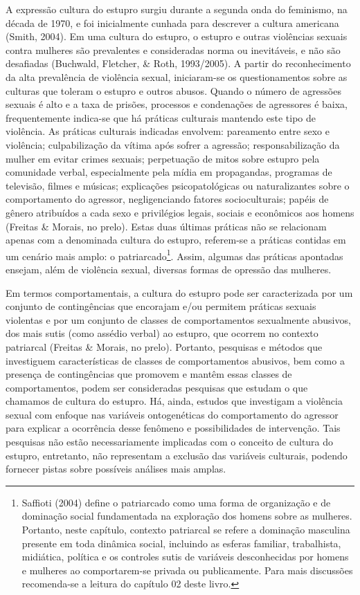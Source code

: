 A expressão cultura do estupro surgiu durante a segunda onda do feminismo, na década de 1970, e foi inicialmente cunhada para descrever a cultura americana (Smith, 2004). Em uma cultura do estupro, o estupro e outras violências sexuais contra mulheres são prevalentes e consideradas norma ou inevitáveis, e não são desafiadas (Buchwald, Fletcher, \& Roth, 1993/2005). A partir do reconhecimento da alta prevalência de violência sexual, iniciaram-se os questionamentos sobre as culturas que toleram o estupro e outros abusos. Quando o número de agressões sexuais é alto e a taxa de prisões, processos e condenações de agressores é baixa, frequentemente indica-se que há práticas culturais mantendo este tipo de violência. As práticas culturais indicadas envolvem: pareamento entre sexo e violência; culpabilização da vítima após sofrer a agressão; responsabilização da mulher em evitar crimes sexuais; perpetuação de mitos sobre estupro pela comunidade verbal, especialmente pela mídia em propagandas, programas de televisão, filmes e músicas; explicações psicopatológicas ou naturalizantes sobre o comportamento do agressor, negligenciando fatores socioculturais; papéis de gênero atribuídos a cada sexo e privilégios legais, sociais e econômicos aos homens (Freitas \& Morais, no prelo). Estas duas últimas práticas não se relacionam apenas com a denominada cultura do estupro, referem-se a práticas contidas em um cenário mais amplo: o patriarcado\footnote{Saffioti (2004) define o patriarcado como uma forma de organização e de dominação social fundamentada na exploração dos homens sobre as mulheres. Portanto, neste capítulo, contexto patriarcal se refere a dominação masculina presente em toda dinâmica social, incluindo as esferas familiar, trabalhista, midiática, política e os controles sutis de variáveis desconhecidas por homens e mulheres ao comportarem-se privada ou publicamente. 
Para mais discussões recomenda-se a leitura do capítulo 02 deste livro.}. Assim, algumas das práticas apontadas ensejam, além de violência sexual, diversas formas de opressão das mulheres.

Em termos comportamentais, a cultura do estupro pode ser caracterizada por um conjunto de contingências que encorajam e/ou permitem práticas sexuais violentas e por um conjunto de classes de comportamentos sexualmente abusivos, dos mais sutis (como assédio verbal) ao estupro, que ocorrem no contexto patriarcal (Freitas \& Morais, no prelo). Portanto, pesquisas e métodos que investiguem características de classes de comportamentos abusivos, bem como a presença de contingências que promovem e mantêm essas classes de comportamentos, podem ser consideradas pesquisas que estudam o que chamamos de cultura do estupro. Há, ainda, estudos que investigam a violência sexual com enfoque nas variáveis ontogenéticas do comportamento do agressor para explicar a ocorrência desse fenômeno e possibilidades de intervenção. Tais pesquisas não estão necessariamente implicadas com o conceito de cultura do estupro, entretanto, não representam a exclusão das 
variáveis culturais, podendo fornecer pistas sobre possíveis análises mais amplas.


